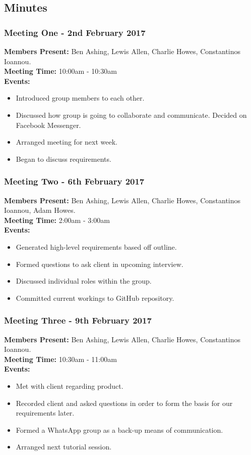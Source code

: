 \documentclass[a4paper]{article}
\begin{document}
\subsection{Minutes}
\subsubsection*{Meeting One - 2nd February 2017}
\textbf{Members Present:} Ben Ashing, Lewis Allen, Charlie Howes, Constantinos Ioannou. \\
\textbf{Meeting Time:} 10:00am - 10:30am \\
\textbf{Events:} 
\begin{itemize}
    \item Introduced group members to each other.
    \item Discussed how group is going to collaborate and communicate. Decided on Facebook Messenger.
    \item Arranged meeting for next week.
    \item Began to discuss requirements.
\end{itemize}

\subsubsection*{Meeting Two - 6th February 2017}
\textbf{Members Present:} Ben Ashing, Lewis Allen, Charlie Howes, Constantinos Ioannou, Adam Howes. \\
\textbf{Meeting Time:} 2:00am - 3:00am \\
\textbf{Events:} 
\begin{itemize}
    \item Generated high-level requirements based off outline.
    \item Formed questions to ask client in upcoming interview.
    \item Discussed individual roles within the group.
    \item Committed current workings to GitHub repository.
\end{itemize}

\subsubsection*{Meeting Three - 9th February 2017}
\textbf{Members Present:} Ben Ashing, Lewis Allen, Charlie Howes, Constantinos Ioannou. \\
\textbf{Meeting Time:} 10:30am - 11:00am \\
\textbf{Events:} 
\begin{itemize}
    \item Met with client regarding product.
    \item Recorded client and asked questions in order to form the basis for our requirements later.
    \item Formed a WhatsApp group as a back-up means of communication.
    \item Arranged next tutorial session.
\end{itemize}
\end{document}
